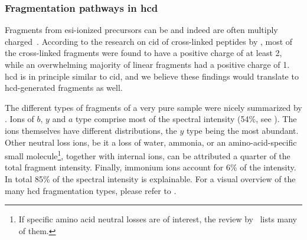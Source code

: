 \subsubsection{Fragmentation pathways in \gls*{hcd}}

Fragments from \gls*{esi}-ionized precursors can be and indeed are often multiply charged~\cite{katta1991use, michalski2012systematic}. According to the research on \gls*{cid} of cross-linked peptides by \citet{giese2016study}, most of the cross-linked fragments were found to have a positive charge of at least 2, while an overwhelming majority of linear fragments had a positive charge of 1. \gls*{hcd} is in principle similar to \gls*{cid}, and we believe these findings would translate to \gls*{hcd}-generated fragments as well.

The different types of fragments of a very pure sample were nicely summarized by \citet{michalski2012systematic}. Ions of \(b\), \(y\) and \(a\) type comprise most of the spectral intensity (54\%, see ). The ions themselves have different distributions, the \(y\) type being the most abundant. Other neutral loss ions, be it a loss of water, ammonia, or an amino-acid-specific small molecule\footnote{If specific amino acid neutral losses are of interest, the review by~\citet{paizs2005fragmentation} lists many of them.}, together with internal ions, can be attributed a quarter of the total fragment intensity. Finally, immonium ions account for 6\% of the intensity. In total 85\% of the spectral intensity is explainable. For a visual overview of the many \gls*{hcd} fragmentation types, please refer to .

